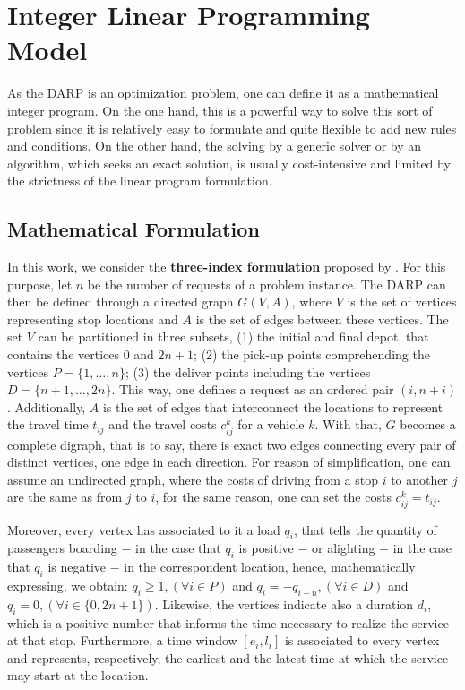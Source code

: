 \documentclass[tuberlin,cic,tc,openright,english,noabntcite,oneside]{iiufrgs}
\begin{document}
\section{Integer Linear Programming Model}\label{sec:integer-programming}
As the DARP is an optimization problem, one can define it as a mathematical integer program. On the one hand, this is a powerful way to solve this sort of problem since it is relatively easy to formulate and quite flexible to add new rules and conditions. On the other hand, the solving by a generic solver or by an algorithm, which seeks an exact solution, is usually cost-intensive and limited by the strictness of the linear program formulation.

\subsection{Mathematical Formulation}
In this work, we consider the \textbf{three-index formulation} proposed by \textcite[p. 574-575]{cordeau_branch-and-cut_2006}. For this purpose, let $n$ be the number of requests of a problem instance. The DARP can then be defined through a directed graph $G(V,A)$, where $V$ is the set of vertices representing stop locations and $A$ is the set of edges between these vertices. The set $V$ can be partitioned in three subsets, (1) the initial and final depot, that contains the vertices $0$ and $2n+1$; (2) the pick-up points comprehending the vertices $P=\{1,\dotsc,n\}$; (3) the deliver points including the vertices $D=\{n+1,\dotsc,2n\}$. This way, one defines a request as an ordered pair $(i,n+i)$. Additionally, $A$ is the set of edges that interconnect the locations to represent the travel time $t_{ij}$ and the travel costs $c_{ij}^{k}$ for a vehicle $k$. With that, $G$ becomes a complete digraph, that is to say, there is exact two edges connecting every pair of distinct vertices, one edge in each direction. For reason of simplification, one can assume an undirected graph, where the costs of driving from a stop $i$ to another $j$ are the same as from $j$ to $i$, for the same reason, one can set the costs $c_{ij}^{k} = t_{ij}$.

Moreover, every vertex has associated to it a load $q_{i}$, that tells the quantity of passengers boarding $-$ in the case that $q_{i}$ is positive $-$ or alighting $-$ in the case that $q_{i}$ is negative $-$ in the correspondent location, hence, mathematically expressing, we obtain: $q_{i}\geq 1, (\forall i \in P)$ and $q_{i} = -q_{i-n}, (\forall i \in D)$ and $q_{i} = 0, (\forall i \in \{0,2n+1\})$. Likewise, the vertices indicate also a duration $d_i$, which is a positive number that informs the time necessary to realize the service at that stop. Furthermore, a time window $[e_{i}, l_{i}]$ is associated to every vertex and represents, respectively, the earliest and the latest time at which the service may start at the location.
\end{document}
